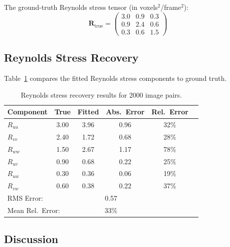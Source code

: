 \documentclass[11pt,a4paper]{article}
\begin{document}
The ground-truth Reynolds stress tensor (in voxels$^2$/frame$^2$):
\begin{equation}
    \mathbf{R}_{\text{true}} = \begin{pmatrix}
        3.0 & 0.9 & 0.3 \\
        0.9 & 2.4 & 0.6 \\
        0.3 & 0.6 & 1.5
    \end{pmatrix}
\end{equation}

\subsection{Reynolds Stress Recovery}

Table~\ref{tab:results} compares the fitted Reynolds stress components to ground truth.

\begin{table}[h]
\centering
\begin{tabular}{@{}lccccc@{}}
\toprule
Component & True & Fitted & Abs.\ Error & Rel.\ Error \\
\midrule
$R_{uu}$ & 3.00 & 3.96 & 0.96 & 32\% \\
$R_{vv}$ & 2.40 & 1.72 & 0.68 & 28\% \\
$R_{ww}$ & 1.50 & 2.67 & 1.17 & 78\% \\
$R_{uv}$ & 0.90 & 0.68 & 0.22 & 25\% \\
$R_{uw}$ & 0.30 & 0.36 & 0.06 & 19\% \\
$R_{vw}$ & 0.60 & 0.38 & 0.22 & 37\% \\
\midrule
\multicolumn{2}{l}{RMS Error:} & \multicolumn{2}{c}{0.57} & \\
\multicolumn{2}{l}{Mean Rel.\ Error:} & \multicolumn{2}{c}{33\%} & \\
\bottomrule
\end{tabular}
\caption{Reynolds stress recovery results for 2000 image pairs.}
\label{tab:results}
\end{table}

\subsection{Discussion}
\end{document}
